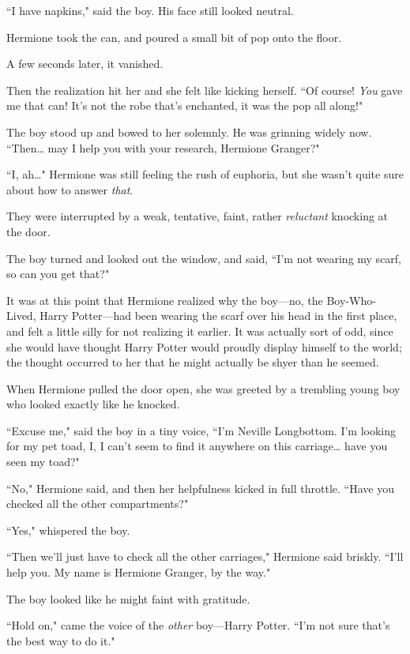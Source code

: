 ``I have napkins," said the boy. His face still looked neutral.

Hermione took the can, and poured a small bit of pop onto the floor.

A few seconds later, it vanished.

Then the realization hit her and she felt like kicking herself. ``Of course! \emph{You} gave me that can! It's not the robe that's enchanted, it was the pop all along!"

The boy stood up and bowed to her solemnly. He was grinning widely now. ``Then{\ldots} may I help you with your research, Hermione Granger?"

``I, ah{\ldots}" Hermione was still feeling the rush of euphoria, but she wasn't quite sure about how to answer \emph{that}.

They were interrupted by a weak, tentative, faint, rather \emph{reluctant} knocking at the door.

The boy turned and looked out the window, and said, ``I'm not wearing my scarf, so can you get that?"

It was at this point that Hermione realized why the boy—no, the Boy-Who-Lived, Harry Potter—had been wearing the scarf over his head in the first place, and felt a little silly for not realizing it earlier. It was actually sort of odd, since she would have thought Harry Potter would proudly display himself to the world; the thought occurred to her that he might actually be shyer than he seemed.

When Hermione pulled the door open, she was greeted by a trembling young boy who looked exactly like he knocked.

``Excuse me," said the boy in a tiny voice, ``I'm Neville Longbottom. I'm looking for my pet toad, I, I can't seem to find it anywhere on this carriage{\ldots} have you seen my toad?"

``No," Hermione said, and then her helpfulness kicked in full throttle. ``Have you checked all the other compartments?"

``Yes," whispered the boy.

``Then we'll just have to check all the other carriages," Hermione said briskly. ``I'll help you. My name is Hermione Granger, by the way."

The boy looked like he might faint with gratitude.

``Hold on," came the voice of the \emph{other} boy—Harry Potter. ``I'm not sure that's the best way to do it."

